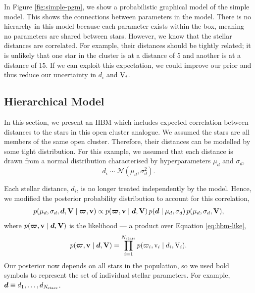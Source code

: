 In Figure \ref{fig:simple-pgm}, we show a probabilistic graphical model of the simple model. This shows the connections between parameters in the model. There is no hierarchy in this model because each parameter exists within the box, meaning no parameters are shared between stars. However, we know that the stellar distances are correlated. For example, their distances should be tightly related; it is unlikely that one star in the cluster is at a distance of 5 and another is at a distance of 15. If we can exploit this expectation, we could improve our prior and thus reduce our uncertainty in \(d_i\) and \(\mathrm{V}_i\).

\subsection{Hierarchical Model}\label{sec:hbm-model}

In this section, we present an HBM which includes expected correlation between distances to the stars in this open cluster analogue. We assumed the stars are all members of the same open cluster. Therefore, their distances can be modelled by some tight distribution. For this example, we assumed that each distance is drawn from a normal distribution characterised by hyperparameters \(\mu_d\) and \(\sigma_d\),
%
\begin{equation}
    d_i \sim \mathcal{N}(\mu_d, \sigma_d^2).
\end{equation}
%

Each stellar distance, \(d_i\), is no longer treated independently by the model. Hence, we modified the posterior probability distribution to account for this correlation,
%
\begin{equation}
    p(\mu_d, \sigma_d, \bm{d}, \bm{\mathrm{V}} \mid \bm{\varpi}, \bm{\mathrm{v}}) \propto p(\bm{\varpi}, \bm{\mathrm{v}} \mid \bm{d}, \bm{\mathrm{V}}) \, p(\bm{d} \mid \mu_d, \sigma_d) \, p(\mu_d, \sigma_d, \bm{\mathrm{V}}),
\end{equation}
%
where \(p(\bm{\varpi}, \bm{\mathrm{v}} \mid \bm{d}, \bm{\mathrm{V}})\) is the likelihood --- a product over Equation \ref{eq:hbm-like},
%
\begin{equation}
    p(\bm{\varpi}, \bm{\mathrm{v}} \mid \bm{d}, \bm{\mathrm{V}}) = \prod_{i=1}^{N_\mathrm{stars}} p(\varpi_i, \mathrm{v}_i \mid d_i, \mathrm{V}_i).
\end{equation}
%
Our posterior now depends on all stars in the population, so we used bold symbols to represent the set of individual stellar parameters. For example, \(\bm{d} \equiv d_1, \dots, d_{N_\mathrm{stars}}\).

